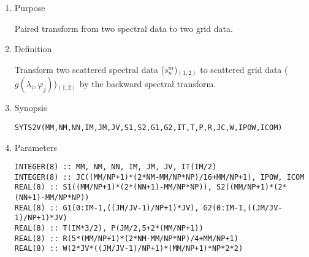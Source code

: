 \documentclass[a4paper]{scrartcl}
\begin{document}
\begin{enumerate}

\item Purpose

Paired transform from two spectral data to two grid data.  

\item Definition

Transform two scattered spectral data ($s^m_n$)$_{(1,2)}$ 
to scattered grid data ($g(\lambda_i,\varphi_j)$)$_{(1,2)}$ 
by the backward spectral transform.

\item Synopsis 

\texttt{SYTS2V(MM,NM,NN,IM,JM,JV,S1,S2,G1,G2,IT,T,P,R,JC,W,IPOW,ICOM)}
  
\item Parameters

\begin{verbatim}        
INTEGER(8) :: MM, NM, NN, IM, JM, JV, IT(IM/2)
INTEGER(8) :: JC((MM/NP+1)*(2*NM-MM/NP*NP)/16+MM/NP+1), IPOW, ICOM
REAL(8) :: S1((MM/NP+1)*(2*(NN+1)-MM/NP*NP)), S2((MM/NP+1)*(2*(NN+1)-MM/NP*NP))
REAL(8) :: G1(0:IM-1,((JM/JV-1)/NP+1)*JV), G2(0:IM-1,((JM/JV-1)/NP+1)*JV)
REAL(8) :: T(IM*3/2), P(JM/2,5+2*(MM/NP+1))
REAL(8) :: R(5*(MM/NP+1)*(2*NM-MM/NP*NP)/4+MM/NP+1)
REAL(8) :: W(2*JV*((JM/JV-1)/NP+1)*(MM/NP+1)*NP*2*2)
\end{verbatim}      


\end{enumerate}
\end{document}
